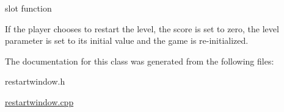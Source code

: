 slot function 

\-If the player chooses to restart the level, the score is set to zero, the level parameter is set to its initial value and the game is re-\/initialized. 

\-The documentation for this class was generated from the following files\-:\begin{DoxyCompactItemize}
\item 
restartwindow.\-h\item 
\hyperlink{restartwindow_8cpp}{restartwindow.\-cpp}\end{DoxyCompactItemize}
